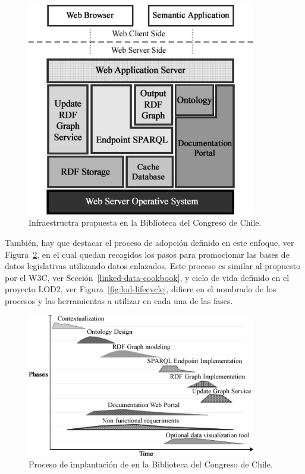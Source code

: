 \begin{figure}[!htb]
\centering
	\includegraphics[width=10cm]{images/phd/infrastructure}
\caption{Infraestructra \linkeddata propuesta en la Biblioteca del Congreso de Chile.}
\label{fig:bcn-infraestructura}
\end{figure}

También, hay que destacar el proceso de adopción definido en este enfoque, ver Figura~\ref{fig:bcn-proceso}, en el cual
quedan recogidos los pasos para promocionar las bases de datos legislativas utilizando datos enlazados. Este proceso
es similar al propuesto por el \gls{W3C}, ver Sección~\ref{linked-data-cookbook}, y ciclo de vida definido en el proyecto LOD2, ver Figura~\ref{fig:lod-lifecycle}, 
difiere en el nombrado de los procesos y las herramientas a utilizar en cada una de las fases.

\begin{figure}[!htb]
\centering
	\includegraphics[width=10cm]{images/phd/process}
\caption{Proceso de implantación de \linkeddata en la Biblioteca del Congreso de Chile.}
\label{fig:bcn-proceso}
\end{figure}


